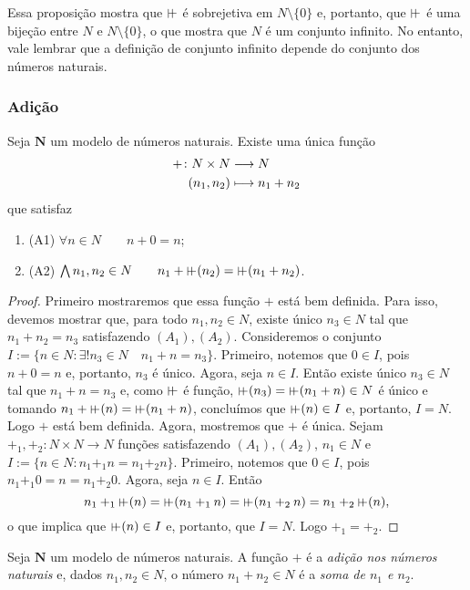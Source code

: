 Essa proposição mostra que $\suce$ é sobrejetiva em $N \setminus \{0\}$ e, portanto, que $\suce$ é uma bijeção entre $N$ e $N \setminus \{0\}$, o que mostra que $N$ é um conjunto infinito. No entanto, vale lembrar que a definição de conjunto infinito depende do conjunto dos números naturais.

\subsubsection{Adição}

\begin{theorem}
	Seja $\bm N$ um modelo de números naturais. Existe uma única função
	\begin{align*}
	{+}\colon {N \times N} &\longrightarrow {N} \\{(n_1,n_2)} &\longmapsto n_1+n_2
	\end{align*}
que satisfaz
	\begin{enumerate}
	\item (A1) $\forall n \in N \qquad n + 0 = n$;
	\item (A2) $\forall n_1,n_2 \in N \qquad n_1 + \suce(n_2) = \suce(n_1+n_2)$.
	\end{enumerate}
\end{theorem}
\begin{proof}
	Primeiro mostraremos que essa função $+$ está bem definida. Para isso, devemos mostrar que, para todo $n_1,n_2 \in N$, existe único $n_3 \in N$ tal que $n_1+n_2=n_3$ satisfazendo $(A_1),(A_2)$. Consideremos o conjunto $I := \{n \in N : \exists! n_3 \in N \quad n_1+n=n_3\}$. Primeiro, notemos que $0 \in I$, pois $n+0=n$ e, portanto, $n_3$ é único. Agora, seja $n \in I$. Então existe único $n_3 \in N$ tal que $n_1+n=n_3$ e, como $\suce$ é função, $\suce(n_3)=\suce(n_1+n) \in N$ é único e tomando $n_1+\suce(n)=\suce(n_1+n)$, concluímos que $\suce(n) \in I$ e, portanto, $I=N$. Logo $+$ está bem definida. Agora, mostremos que $+$ é única. Sejam $+_1,+_2:N \times N \to N$ funções satisfazendo $(A_1),(A_2)$, $n_1 \in N$ e $I := \{n \in N : n_1 +_1 n = n_1 +_2 n \}$. Primeiro, notemos que $0 \in I$, pois $n_1 +_1 0 =n = n_1 +_2 0$. Agora, seja $n \in I$. Então
	\begin{equation*}
	n_1 +_1 \suce(n) = \suce(n_1 +_1 n) = \suce(n_1 +_2 n) = n_1 +_2 \suce(n),
	\end{equation*}
o que implica que $\suce(n) \in I$ e, portanto, que $I=N$. Logo $+_1 = +_2$.
\end{proof}

\begin{definition}
	Seja $\bm N$ um modelo de números naturais. A função $+$ é a \emph{adição nos números naturais} e, dados $n_1,n_2 \in N$, o número $n_1 + n_2 \in N$ é a \emph{soma de $n_1$ e $n_2$}.
\end{definition}

